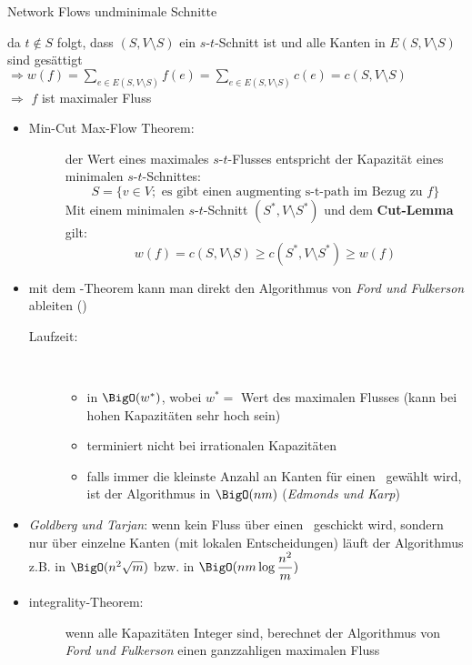 \begin{TOPbreak}{Network Flows und}{minimale Schnitte}
\begin{itemize}
\begin{description}
\begin{description}
					da $t \notin S$ folgt, dass $(S,V\setminus S)$ ein $s$-$t$-Schnitt ist und alle Kanten in $E(S,V\setminus S)$ sind gesättigt\\
					$\Rightarrow w(f) = \sum\limits_{e\in E(S,V\setminus S)} f(e) = \sum\limits_{e\in E(S,V\setminus S)} c(e) = c(S,V\setminus S)$\\
					$\Rightarrow $ $f$ ist maximaler Fluss 
				\end{description}
			\end{description}
	\end{itemize}
	\topbreak
	\vspace*{-1.5\baselineskip}\begin{itemize}
		\item \begin{description}
				\item[Min-Cut Max-Flow Theorem:] der Wert eines maximales $s$-$t$-Flusses entspricht der Kapazität eines minimalen $s$-$t$-Schnittes:
				\[S=\{v \in V; \text{ es gibt einen augmenting s-t-path im Bezug zu }f\}\]
				Mit einem minimalen $s$-$t$-Schnitt $(S^{*}, V\setminus S^{*})$ und dem \textbf{Cut-Lemma} gilt:
				\[w(f) = c(S,V\setminus S) \geq c(S^{*}, V\setminus S^{*}) \geq w(f)\]
			\end{description}
		\item mit dem \aug-Theorem kann man direkt den Algorithmus von \textit{Ford und Fulkerson} ableiten ()
			\begin{description}
				\item[Laufzeit:]\ \\\up
					\begin{itemize}
						\item in $\BigO(w^{*})$, wobei $w^{*}=$ Wert des maximalen Flusses (kann bei hohen Kapazitäten sehr hoch sein)
						\item terminiert nicht bei irrationalen Kapazitäten
						\item falls immer die kleinste Anzahl an Kanten für einen \aug~gewählt wird, ist der Algorithmus in $\BigO(nm)$ (\textit{Edmonds und Karp})
					\end{itemize}
			\end{description}
		\item \textit{Goldberg und Tarjan}: wenn kein Fluss über einen \aug~geschickt wird, sondern nur über einzelne Kanten (mit lokalen Entscheidungen) läuft der Algorithmus z.B. in $\BigO(n^2\sqrt{m})$ bzw. in $\BigO(nm\log \dfrac{n^2}{m})$
		\item \begin{description}
			\item[integrality-Theorem:] wenn alle Kapazitäten Integer sind, berechnet der Algorithmus von \textit{Ford und Fulkerson} einen ganzzahligen maximalen Fluss
		\end{description}
	\end{itemize}
\end{TOPbreak}